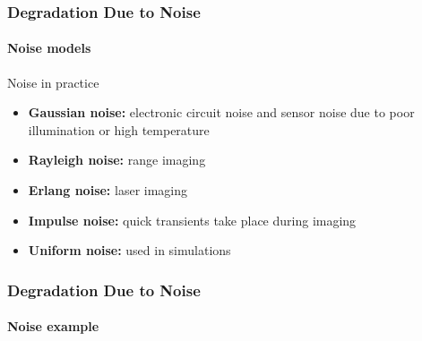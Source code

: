 \documentclass{beamer}
\begin{document}
\begin{frame}
\frametitle{Degradation Due to Noise}
\framesubtitle{Noise models}
\begin{block}{Noise in practice}
\begin{itemize}
\item \textbf{Gaussian noise:} electronic circuit noise and sensor noise due to poor illumination or high temperature
\item \textbf{Rayleigh noise:} range imaging 
\item \textbf{Erlang noise:} laser imaging
\item \textbf{Impulse noise:}  quick transients take place during imaging
\item \textbf{Uniform noise:} used in simulations
\end{itemize}
\end{block}
\end{frame}
\begin{frame}
\frametitle{Degradation Due to Noise}
\framesubtitle{Noise example}
\begin{columns}
\end{columns}
\end{frame}
\end{document}
